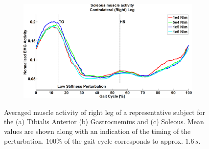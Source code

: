 \begin{figure}
\vspace{3 mm}

\begin{subfigure}{1.0\columnwidth}
	\centering
	\includegraphics[width=.9\columnwidth]{Figures/SOL_all_mean}
	\caption{}
	\label{solAllMean}
\end{subfigure}

\caption{Averaged muscle activity of right leg of a representative subject for the (a) Tibialis Anterior (b) Gastrocnemius and (c) Soleous. Mean values are shown along with an indication of the timing of the perturbation. $100\%$ of the gait cycle corresponds to approx. $1.6\,s$.}
\label{muscleActivityFigure}
\end{figure}
